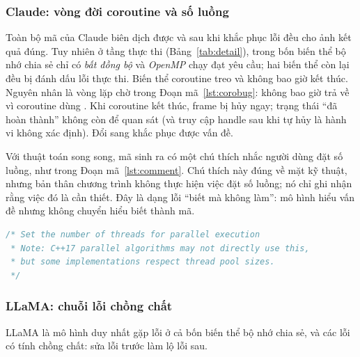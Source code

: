 \subsubsection{Claude: vòng đời coroutine và số luồng}

Toàn bộ mã của Claude biên dịch được và sau khi khắc phục lỗi đều cho ảnh kết quả
đúng. Tuy nhiên ở tầng thực thi (Bảng~\ref{tab:detail}), trong bốn biến thể bộ nhớ
chia sẻ chỉ có \emph{bất đồng bộ} và \emph{OpenMP} chạy đạt yêu cầu; hai biến thể
còn lại đều bị đánh dấu lỗi thực thi. Biến thể coroutine treo và không bao giờ kết
thúc. Nguyên nhân là vòng lặp chờ trong Đoạn mã~\ref{lst:corobug}: 
không bao giờ trả về  vì coroutine dùng
. Khi coroutine kết thúc, frame bị hủy
ngay; trạng thái “đã hoàn thành” không còn để quan sát (và truy cập handle sau khi
tự hủy là hành vi không xác định). Đổi sang  khắc phục
được vấn đề.

Với thuật toán song song, mã sinh ra có một chú thích nhắc người dùng đặt số
luồng, như trong Đoạn mã~\ref{lst:comment}. Chú thích này đúng về mặt kỹ thuật,
nhưng bản thân chương trình không thực hiện việc đặt số luồng; nó chỉ ghi nhận
rằng việc đó là cần thiết. Đây là dạng lỗi “biết mà không làm”: mô hình hiểu vấn
đề nhưng không chuyển hiểu biết thành mã.

\begin{lstlisting}[language=C++,caption={Chú thích về số luồng trong mã Claude (Listing 3 trong bài báo gốc).},label={lst:comment}]
/* Set the number of threads for parallel execution
 * Note: C++17 parallel algorithms may not directly use this,
 * but some implementations respect thread pool sizes.
 */
\end{lstlisting}

\subsubsection{LLaMA: chuỗi lỗi chồng chất}

LLaMA là mô hình duy nhất gặp lỗi ở cả bốn biến thể bộ nhớ chia sẻ, và các lỗi có
tính chồng chất: sửa lỗi trước làm lộ lỗi sau.

